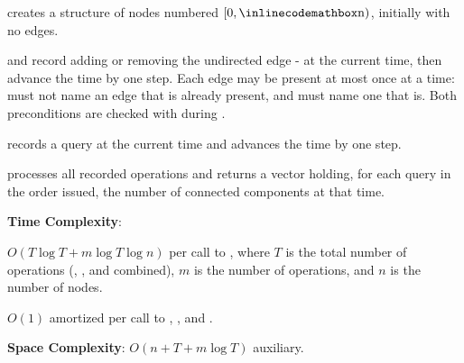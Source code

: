\begin{compactitem}
  \item {} creates a structure of  nodes numbered $[0, {\inlinecodemath{n}})$, initially with no edges.
  \item {} and  record adding or removing the undirected edge - at the current time, then advance the time by one step. Each edge may be present at most once at a time:  must not name an edge that is already present, and  must name one that is. Both preconditions are checked with  during .
  \item {} records a query at the current time and advances the time by one step.
  \item {} processes all recorded operations and returns a vector holding, for each  query in the order issued, the number of connected components at that time.
\end{compactitem}

\textbf{Time Complexity}:
\begin{compactitem}
  \item $O(T \log T + m \log T \log n)$ per call to , where $T$ is the total number of operations (, , and  combined), $m$ is the number of  operations, and $n$ is the number of nodes.
  \item $O(1)$ amortized per call to , , and .
\end{compactitem}

\textbf{Space Complexity}: $O(n + T + m \log T)$ auxiliary.

